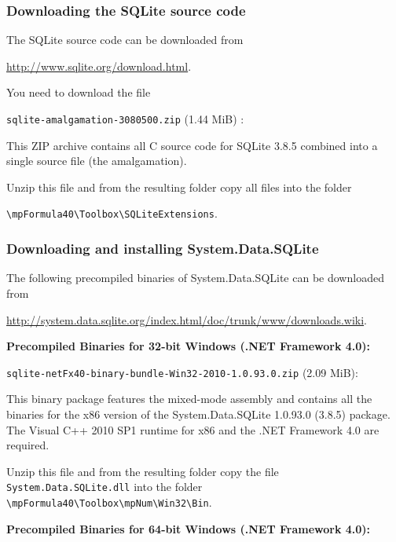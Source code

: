 \subsubsection{Downloading the SQLite source code}

The SQLite source code can be downloaded from

\href{http://www.sqlite.org/download.html}{http://www.sqlite.org/download.html}. 

You need to download the file

\vpara
\verb|sqlite-amalgamation-3080500.zip| (1.44 MiB) : 

\vpara
This ZIP archive contains all C source code for SQLite 3.8.5 combined into a single source file (the amalgamation).

\vpara
Unzip this file and from the resulting folder copy all files  into the folder 

\verb|\mpFormula40\Toolbox\SQLiteExtensions|. 



\subsubsection{Downloading and installing  System.Data.SQLite}

The following precompiled binaries of System.Data.SQLite can be downloaded from

\href{http://system.data.sqlite.org/index.html/doc/trunk/www/downloads.wiki}{http://system.data.sqlite.org/index.html/doc/trunk/www/downloads.wiki}. 


\vspace{0.6cm}
\textbf{Precompiled Binaries for 32-bit Windows (.NET Framework 4.0):}

\vpara
\verb|sqlite-netFx40-binary-bundle-Win32-2010-1.0.93.0.zip| (2.09 MiB): 

\vpara
This binary package features the mixed-mode assembly and contains all the binaries for the x86 version of the System.Data.SQLite 1.0.93.0 (3.8.5) package. The Visual C++ 2010 SP1 runtime for x86 and the .NET Framework 4.0 are required.

\vpara
Unzip this file and from the resulting folder copy the file \verb|System.Data.SQLite.dll|  into the folder \verb|\mpFormula40\Toolbox\mpNum\Win32\Bin|. 




\vspace{0.6cm}
\textbf{Precompiled Binaries for 64-bit Windows (.NET Framework 4.0):}

